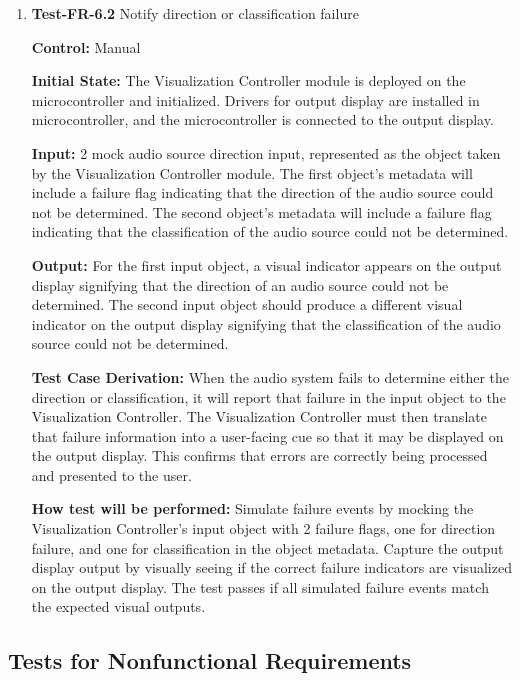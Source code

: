 \documentclass[12pt, titlepage]{article}
\begin{document}
\begin{enumerate}
\item{\textbf{Test-FR-6.2} Notify direction or classification failure\\}

\textbf{Control:} Manual
					
\textbf{Initial State:}
The Visualization Controller module is deployed on the microcontroller and
initialized. Drivers for output display are installed in microcontroller, and
the microcontroller is connected to the output display. 
					
\textbf{Input:}
2 mock audio source direction input, represented as the object taken by the
Visualization Controller module. The first object's metadata will include a
failure flag indicating that the direction of the audio source could not be
determined. The second object's metadata will include a failure flag indicating
that the classification of the audio source could not be determined.
					
\textbf{Output:}
For the first input object, a visual indicator appears on the output display
signifying that the direction of an audio source could not be determined. The
second input object should produce a different visual indicator on the output
display signifying that the classification of the audio source could not be
determined. 

\textbf{Test Case Derivation:} 
When the audio system fails to determine either the direction or classification,
 it will report that failure in the input object to the Visualization
 Controller. The Visualization Controller must then translate that failure
 information into a user-facing cue so that it may be displayed on the output
 display. This confirms that errors are correctly being processed and presented
 to the user. 
					
\textbf{How test will be performed:}
Simulate failure events by mocking the Visualization Controller's input object
with 2 failure flags, one for direction failure, and one for classification in
the object metadata. Capture the output display output by visually seeing if the
correct failure indicators are visualized on the output display. The test passes
if all simulated failure events match the expected visual outputs.

\end{enumerate}


\subsection{Tests for Nonfunctional Requirements}
\end{document}
